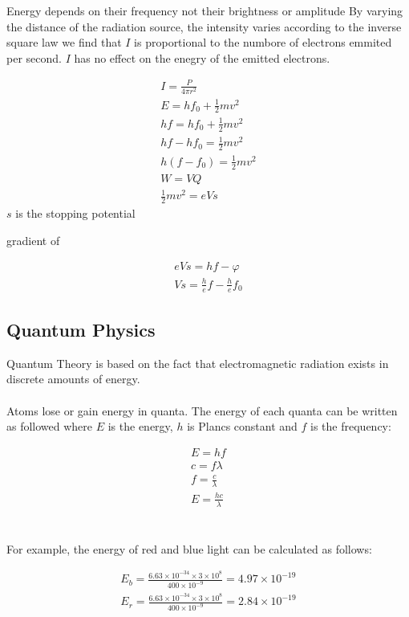 \documentclass{article}
\begin{document}
Energy depends on their frequency not their brightness or amplitude
By varying the distance of the radiation source, the intensity
varies according to the inverse square law
we find that $I$ is proportional to the 
numbore of electrons emmited per second.
$I$ has no effect on the enegry of the emitted electrons.

\begin{gather}
	I = \frac{P}{4 \pi r^2} \\
	E = hf_0 + \frac{1}{2}mv^2 \\
	hf = hf_0 + \frac{1}{2}mv^2 \\
	hf - hf_0 = \frac{1}{2}mv^2 \\
	h(f - f_0) = \frac{1}{2}mv^2 \\
	W = VQ \\
	\frac{1}{2}mv^2 = eVs
\end{gather}
$s$ is the stopping potential

gradient of 

\begin{gather}
	eVs = hf - \varphi \\
	Vs = \frac{h}{e} f - \frac{h}{e} f_0
\end{gather}

\subsection{Quantum Physics}
Quantum Theory is based on the fact that electromagnetic radiation exists in
discrete amounts of energy.
\\\\
Atoms lose or gain energy in quanta.
The energy of each quanta can be written as followed where $E$ is the energy,
$h$ is Plancs constant and $f$ is the frequency:

\begin{gather}
	E = hf \\
	c = f \lambda \\
	f = \frac{c}{\lambda} \\
	E = \frac{hc}{\lambda}
\end{gather}
\\\\
For example, the energy of red and blue light can be calculated as follows:

\begin{gather}
	E_b = \frac{6.63 \times 10 ^{-34} \times 3 \times 10 ^{8}}{400 \times 10^{-9}} = 4.97 \times 10 ^{-19} \\
	E_r = \frac{6.63 \times 10 ^{-34} \times 3 \times 10 ^{8}}{400 \times 10^{-9}} = 2.84 \times 10 ^{-19}
\end{gather}
\end{document}

